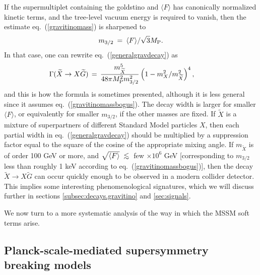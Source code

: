 \documentclass[11pt]{article}
\def\beq{\begin{eqnarray}}
\def\eeq{\end{eqnarray}}
\def\stilde{\widetilde}
\def\MPlanck{M_{\rm P}}
\def\centeron#1#2{{\setbox0=\hbox{#1}\setbox1=\hbox{#2}\ifdim
\wd1>\wd0\kern.5\wd1\kern-.5\wd0\fi
\copy0\kern-.5\wd0\kern-.5\wd1\copy1\ifdim\wd0>\wd1
\kern.5\wd0\kern-.5\wd1\fi}}
\def\ltap{\;\centeron{\raise.35ex\hbox{$<$}}{\lower.65ex\hbox{$\sim$}}\;}
\def\lsim{\mathrel{\ltap}}
\begin{document}
If the supermultiplet containing the goldstino and $\langle F \rangle$ has
canonically normalized kinetic terms, and the tree-level
vacuum energy is required to
vanish, then the estimate eq.~(\ref{gravitinomass}) is
sharpened to
\beq
m_{3/2} \>=\> {\langle F \rangle / \sqrt{3} \MPlanck} .
\label{gravitinomassbogus}
\eeq
In that case, one can rewrite eq.~(\ref{generalgravdecay}) as
\beq
\Gamma(\stilde X \rightarrow X\stilde G) \,=\,
{m_{\stilde X}^5 \over 48 \pi \MPlanck^2 m_{3/2}^2}
\left ( 1 - {m_X^2/ m_{\stilde X}^2} \right )^4 ,
\qquad\>\>{}
\label{specificgravdecay}
\eeq
and this is how the formula is sometimes presented, although it is less 
general since it assumes eq.~(\ref{gravitinomassbogus}). The 
decay width is larger for smaller $\langle F \rangle$, or equivalently for 
smaller $m_{3/2}$, if the other masses are fixed.  If $\stilde X$ is a 
mixture of superpartners of different Standard Model particles $X$, then 
each partial width in eq.~(\ref{generalgravdecay}) should be multiplied by a 
suppression factor equal to the square of the cosine of the appropriate 
mixing angle. If $m_{\stilde X}$ is of order 100 GeV or more, and $\sqrt{ 
\langle F\rangle } \lsim$ few $\times 10^6$ GeV [corresponding to 
$m_{3/2}$ less than roughly 1 keV according to 
eq.~(\ref{gravitinomassbogus})], then the decay $\stilde X \rightarrow X 
\stilde G$ can occur quickly enough to be observed in a modern collider 
detector. This implies some interesting phenomenological signatures, 
which we will discuss further in sections \ref{subsec:decays.gravitino} 
and \ref{sec:signals}.

We now turn to a more systematic analysis of the way in which the MSSM 
soft terms arise.

\subsection{Planck-scale-mediated supersymmetry breaking
models}\label{subsec:origins.sugra}
\setcounter{equation}{0}
\setcounter{footnote}{1}
\end{document}
